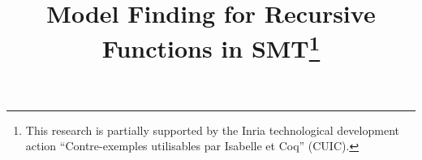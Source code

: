 
\newcommand\ty[1]{\con{#1}}
\newcommand{\Bool}{\ty{Bool}}
\newcommand{\ltrue}{\top}
\newcommand{\lfalse}{\bot}
\newcommand{\lite}{\con{ite}}

\newcommand\concret{\gamma} %

\newcommand{\boolop}{\con{b}}
\newcommand{\forallf}[1]{\forall_{\!#1\:}}
\newcommand{\fnull}{\emptyset}
\newcommand{\vecfarg}[1]{\vec{\concret}_{#1}}
\newcommand{\farg}[1]{\concret_{#1}}
\newcommand{\fargx}[2]{\concret_{#1,#2}}
\newcommand{\fargtype}[1]{\alpha_{#1}}

\newcommand{\Sigmalia}{\Sigma_{\mathcalx{LIA}}}
\newcommand{\extendsig}[1]{\mathcalx{E}( #1 )}

\newcommand{\rem}[1]{\textcolor{red}{[#1]}}
\newcommand{\ajr}[1]{\rem{#1 --ajr}}
\newcommand{\jb}[1]{\rem{#1 --jb}}
\newcommand{\ct}[1]{\rem{#1 --ct}}

\newcommand{\negvthinspace}{\kern-0.083333em}
\newcommand{\vthinspace}{\kern+0.083333em}
\newcommand{\vvthinspace}{\kern+0.0416666em}
\newcommand{\typ}[1]{^{\vthinspace #1}}

\newcommand{\definefunreccmd}{\con{define}\text{-}\con{fun}\text{-}\con{rec}}
\newcommand{\definefunsreccmd}{\con{define}\text{-}\con{funs}\text{-}\con{rec}}

\newcommand{\Mo}{{\mathcal{I}}}

\newcommand{\euf}{\ensuremath{\mathcalx{UF}}\xspace}
\newcommand{\ari}{\ensuremath{\mathcalx{A}}\xspace}

\newcommand{\absconstraints}{\mathrm{X}}

%
%
\usepackage{program}

\def\squareforqed{\hbox{\rlap{$\sqcap$}$\sqcup$}}

\newcommand\xend{{\hfill$\scriptstyle\blacksquare$}}
\renewcommand\qed{{\hfill$\squareforqed$}}




\title{Model Finding for Recursive Functions in SMT\thanks{%
This research is partially supported by the Inria technological development
action ``Contre-exemples utilisables par Isabelle et Coq'' (CUIC).
}
}


